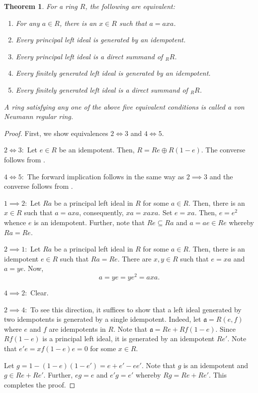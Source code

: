 \documentclass[12pt]{article}
\theoremstyle{thmstyle}
\newtheorem{theorem}{Theorem}[section]
\theoremstyle{defstyle}
\newcommand{\fraka}{\mathfrak{a}} %
\begin{document}
\begin{theorem}
    For a ring $R$, the following are equivalent: 
    \begin{enumerate}[label=(\arabic*)]
        \item For any $a\in R$, there is an $x\in R$ such that $a = axa$.
        \item Every principal left ideal is generated by an idempotent. 
        \item Every principal left ideal is a direct summand of ${}_RR$.
        \item Every finitely generated left ideal is generated by an idempotent. 
        \item Every finitely generated left ideal is a direct summand of ${}_RR$.
    \end{enumerate}
    A ring satisfying any one of the above five equivalent conditions is called a \emph{von Neumann regular ring}.
\end{theorem}
\begin{proof}
    First, we show equivalences $2\iff 3$ and $4\iff 5$.

    $2\iff 3:$ Let $e\in R$ be an idempotent. Then, $R = Re\oplus R(1 - e)$. The converse follows from .

    $4\iff 5:$ The forward implication follows in the same way as $2\implies 3$ and the converse follows from .

    $1\implies 2:$ Let $Ra$ be a principal left ideal in $R$ for some $a\in R$. Then, there is an $x\in R$ such that $a = axa$, consequently, $xa = xaxa$. Set $e = xa$. Then, $e = e^2$ whence $e$ is an idempotent. Further, note that $Re\subseteq Ra$ and $a = ae\in Re$ whereby $Ra = Re$.

    $2\implies 1:$ Let $Ra$ be a principal left ideal in $R$ for some $a\in R$. Then, there is an idempotent $e\in R$ such that $Ra = Re$. There are $x,y\in R$ such that $e = xa$ and $a = ye$. Now, 
    \begin{equation*}
        a = ye = ye^2 = axa.
    \end{equation*}

    $4\implies 2:$ Clear.

    $2\implies 4:$ To see this direction, it suffices to show that a left ideal generated by two idempotents is generated by a single idempotent. Indeed, let $\fraka = R(e, f)$ where $e$ and $f$ are idempotents in $R$. Note that $\fraka = Re + Rf(1 - e)$. Since $Rf(1 - e)$ is a principal left ideal, it is generated by an idempotent $Re'$. Note that $e'e = xf(1 - e)e = 0$ for some $x\in R$. 

    Let $g = 1 - (1 - e)(1 - e') = e + e' - ee'$. Note that $g$ is an idempotent and $g\in Re + Re'$. Further, $eg = e$ and $e'g = e'$ whereby $Rg = Re + Re'$. This completes the proof.
\end{proof}
\end{document}
